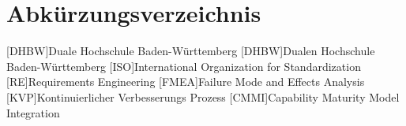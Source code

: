 \section*{Abkürzungsverzeichnis}
\begin{acronym}
  [DHBW]{Duale Hochschule Ba\-den-\-Würt\-tem\-berg}
  [DHBW]{Dualen Hochschule Ba\-den-\-Würt\-tem\-berg}
  [ISO]{International Organization for Standardization}
  [RE]{Requirements Engineering}
  [FMEA]{Failure Mode and Effects Analysis}
  [KVP]{Kontinuierlicher Verbesserungs Prozess}
  [CMMI]{Capability Maturity Model Integration}
\end{acronym}
\newpage